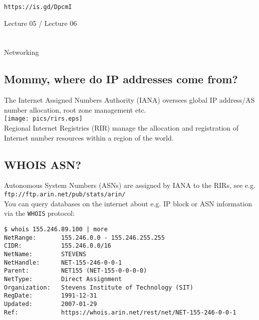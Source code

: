 \documentclass[xga]{xdvislides}
\begin{document}
\verb+https://is.gd/DpcmI+


\newpage
\vspace*{\fill}
\begin{center}
    \Hugesize
        Lecture 05 / Lecture 06 \\ [1em]
    \hspace*{5mm}
    \blueline\\
    \hspace*{5mm}\\
	Networking
\end{center}
\vspace*{\fill}

\subsection{Mommy, where do IP addresses come from?}
\vspace*{\fill}
\begin{center}
The Internet Assigned Numbers Authority (IANA) oversees global IP
address/AS number allocation, root zone management etc. \\
	\vspace{.5in}
	\texttt{[image: pics/rirs.eps]} \\
	\vspace{.5in}
	Regional Internet Registries (RIR) manage the allocation and
registration of Internet number resources within a region of the world.
\end{center}
\vspace*{\fill}

\subsection{WHOIS ASN?}
Autonomous System Numbers (ASNs) are assigned by IANA
to the RIRs, see e.g. {\tt
ftp://ftp.arin.net/pub/stats/arin/}
\\

You can query databases on the internet about e.g. IP
block or ASN information via the {\tt WHOIS} protocol:

\begin{verbatim}
$ whois 155.246.89.100 | more
NetRange:       155.246.0.0 - 155.246.255.255
CIDR:           155.246.0.0/16
NetName:        STEVENS
NetHandle:      NET-155-246-0-0-1
Parent:         NET155 (NET-155-0-0-0-0)
NetType:        Direct Assignment
Organization:   Stevens Institute of Technology (SIT)
RegDate:        1991-12-31
Updated:        2007-01-29
Ref:            https://whois.arin.net/rest/net/NET-155-246-0-0-1
\end{verbatim}
\end{document}
